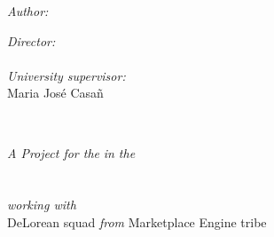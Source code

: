 \documentclass[
11pt, %
oneside, %
english,
singlespacing, %
headsepline, %
]{MastersDoctoralThesis} %
\def \universitysupervisor{Maria José Casañ}
\def \tribe{Marketplace Engine tribe}
\def \squad{DeLorean squad}
\begin{document}
\begin{titlepage}
\begin{center}
\begin{minipage}[t]{0.4\textwidth}
\begin{flushleft} \large
\emph{Author:}\\
\authorname %
\end{flushleft}
\end{minipage}
\begin{minipage}[t]{0.4\textwidth}
\begin{flushright} \large
\emph{Director:} \\
\supname %
\\
\emph{University supervisor:} \\
\universitysupervisor
\end{flushright}
\end{minipage}\\[3cm]
 
\vfill

\large \textit{A Project for the}
\large \degreename 
\textit{ in the}\\[0.2cm]
\deptname\\[0.2cm]
\facname\\[0.2cm]
\textit{working with}\\[0.2cm]
\squad
\textit{ from}
\tribe\\
\vfill

{\large {}}\\[4cm] %
 
\vfill
\end{center}
\end{titlepage}

\end{document}
